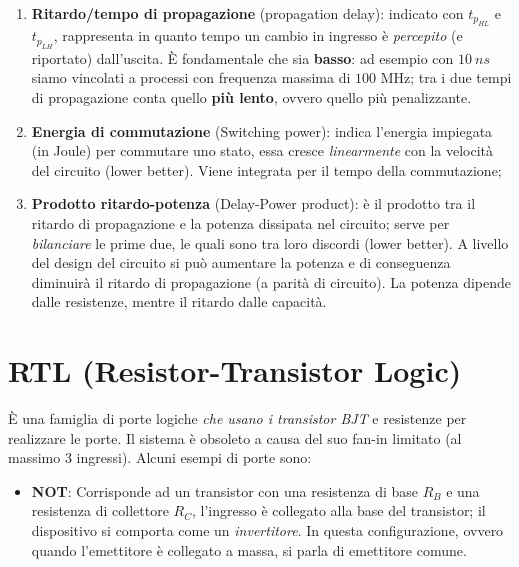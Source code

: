 \documentclass[
]{book}
\providecommand{\tightlist}{%
  \setlength{\itemsep}{0pt}\setlength{\parskip}{0pt}}
\begin{document}
\begin{enumerate}
\def\labelenumi{\arabic{enumi})}
\tightlist
\item
  \textbf{Ritardo/tempo di propagazione} (propagation delay): indicato
  con \(t_{p_{HL}}\) e \(t_{p_{LH}}\), rappresenta in quanto tempo un
  cambio in ingresso è \emph{percepito} (e riportato) dall'uscita. È
  fondamentale che sia \textbf{basso}: ad esempio con \(10\:ns\) siamo
  vincolati a processi con frequenza massima di \(100\) MHz; tra i due
  tempi di propagazione conta quello \textbf{più lento}, ovvero quello
  più penalizzante.
\item
  \textbf{Energia di commutazione} (Switching power): indica l'energia
  impiegata (in Joule) per commutare uno stato, essa cresce
  \emph{linearmente} con la velocità del circuito (lower better). Viene
  integrata per il tempo della commutazione;
\item
  \textbf{Prodotto ritardo-potenza} (Delay-Power product): è il prodotto
  tra il ritardo di propagazione e la potenza dissipata nel circuito;
  serve per \emph{bilanciare} le prime due, le quali sono tra loro
  discordi (lower better). A livello del design del circuito si può
  aumentare la potenza e di conseguenza diminuirà il ritardo di
  propagazione (a parità di circuito). La potenza dipende dalle
  resistenze, mentre il ritardo dalle capacità.
\end{enumerate}

\section{RTL (Resistor-Transistor
Logic)}\label{rtl-resistor-transistor-logic}

È una famiglia di porte logiche \emph{che usano i transistor BJT} e
resistenze per realizzare le porte. Il sistema è obsoleto a causa del
suo fan-in limitato (al massimo 3 ingressi). Alcuni esempi di porte
sono:

\begin{itemize}
\tightlist
\item
  \textbf{NOT}: Corrisponde ad un transistor con una resistenza di base
  \(R_B\) e una resistenza di collettore \(R_C\), l'ingresso è collegato
  alla base del transistor; il dispositivo si comporta come un
  \emph{invertitore}. In questa configurazione, ovvero quando
  l'emettitore è collegato a massa, si parla di emettitore comune.
\end{itemize}
\end{document}
